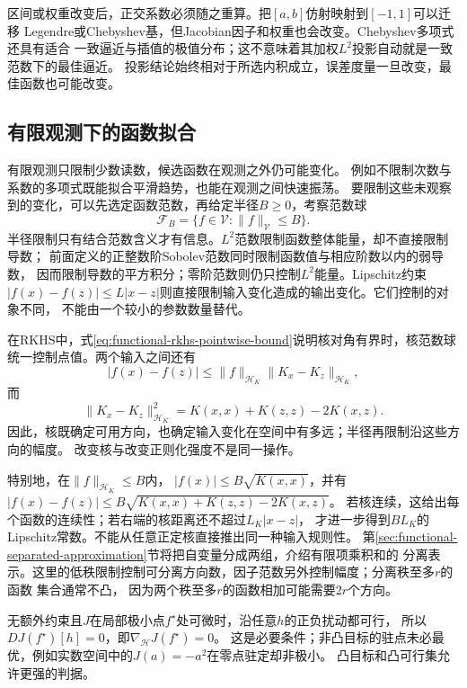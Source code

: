区间或权重改变后，正交系数必须随之重算。把$[a,b]$仿射映射到$[-1,1]$可以迁移
Legendre或Chebyshev基，但Jacobian因子和权重也会改变。Chebyshev多项式还具有适合
一致逼近与插值的极值分布；这不意味着其加权$L^2$投影自动就是一致范数下的最佳逼近。
投影结论始终相对于所选内积成立，误差度量一旦改变，最佳函数也可能改变。

\subsection{有限观测下的函数拟合}
\label{sec:functional-finite-observation-fitting}
\label{sec:functional-class-size-smoothness}


有限观测只限制少数读数，候选函数在观测之外仍可能变化。
例如不限制次数与系数的多项式既能拟合平滑趋势，也能在观测之间快速振荡。
要限制这些未观察到的变化，可以先选定函数范数，再给定半径$B\geq0$，考察范数球
\[
  \mathcal{F}_B
  =
  \{f\in\mathcal{V}:\lVert f\rVert_{\mathcal{V}}\leq B\}.
\]
半径限制只有结合范数含义才有信息。$L^2$范数限制函数整体能量，却不直接限制导数；
前面定义的正整数阶Sobolev范数同时限制函数值与相应阶数以内的弱导数，
因而限制导数的平方积分；零阶范数则仍只控制$L^2$能量。Lipschitz约束
$|f(x)-f(z)|\leq L|x-z|$则直接限制输入变化造成的输出变化。它们控制的对象不同，
不能由一个较小的参数数量替代。

在RKHS中，式\eqref{eq:functional-rkhs-pointwise-bound}说明核对角有界时，核范数球
统一控制点值。两个输入之间还有
\begin{equation}
  |f(x)-f(z)|
  \leq
  \lVert f\rVert_{\mathcal{H}_K}
  \lVert K_x-K_z\rVert_{\mathcal{H}_K},
  \label{eq:functional-rkhs-modulus-bound}
\end{equation}
而
\[
  \lVert K_x-K_z\rVert_{\mathcal{H}_K}^2
  =
  K(x,x)+K(z,z)-2K(x,z).
\]
因此，核既确定可用方向，也确定输入变化在空间中有多远；半径再限制沿这些方向的幅度。
改变核与改变正则化强度不是同一操作。

特别地，在$\lVert f\rVert_{\mathcal H_K}\leq B$内，
$|f(x)|\leq B\sqrt{K(x,x)}$，并有
$|f(x)-f(z)|\leq B\sqrt{K(x,x)+K(z,z)-2K(x,z)}$。
若核连续，这给出每个函数的连续性；若右端的核距离还不超过$L_K|x-z|$，
才进一步得到$BL_K$的Lipschitz常数。不能从任意正定核直接推出同一种输入规则性。
第\ref{sec:functional-separated-approximation}节将把自变量分成两组，介绍有限项乘积和的
分离表示。这里的低秩限制控制可分离方向数，因子范数另外控制幅度；分离秩至多$r$的函数
集合通常不凸，
因为两个秩至多$r$的函数相加可能需要$2r$个方向。

无额外约束且$J$在局部极小点$f^\star$处可微时，沿任意$h$的正负扰动都可行，
所以$DJ(f^\star)[h]=0$，即$\nabla_{\mathcal H}J(f^\star)=0$。
这是必要条件；非凸目标的驻点未必最优，例如实数空间中的$J(a)=-a^2$在零点驻定却非极小。
凸目标和凸可行集允许更强的判据。

